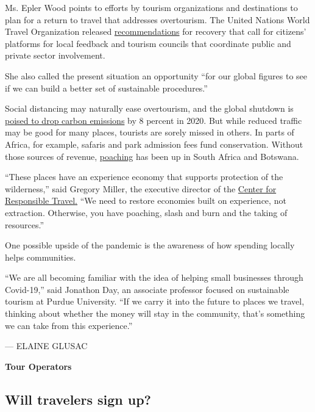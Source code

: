 Ms. Epler Wood points to efforts by tourism organizations and
destinations to plan for a return to travel that addresses overtourism.
The United Nations World Travel Organization released
\href{https://webunwto.s3.eu-west-1.amazonaws.com/s3fs-public/2020-04/COVID19_Recommendations_English_1.pdf}{recommendations}
for recovery that call for citizens' platforms for local feedback and
tourism councils that coordinate public and private sector involvement.

She also called the present situation an opportunity ``for our global
figures to see if we can build a better set of sustainable procedures.''

Social distancing may naturally ease overtourism, and the global
shutdown is
\href{https://www.nytimes.com/2020/04/30/climate/global-emissions-decline.html}{poised
to drop carbon emissions} by 8 percent in 2020. But while reduced
traffic may be good for many places, tourists are sorely missed in
others. In parts of Africa, for example, safaris and park admission fees
fund conservation. Without those sources of revenue,
\href{https://www.nytimes.com/2020/04/08/science/coronavirus-poaching-rhinos.html}{poaching}
has been up in South Africa and Botswana.

``These places have an experience economy that supports protection of
the wilderness,'' said Gregory Miller, the executive director of the
\href{https://www.responsibletravel.org/}{Center for Responsible
Travel}\href{https://www.responsibletravel.org/}{.} ``We need to restore
economies built on experience, not extraction. Otherwise, you have
poaching, slash and burn and the taking of resources.''

One possible upside of the pandemic is the awareness of how spending
locally helps communities.

``We are all becoming familiar with the idea of helping small businesses
through Covid-19,'' said Jonathon Day, an associate professor focused on
sustainable tourism at Purdue University. ``If we carry it into the
future to places we travel, thinking about whether the money will stay
in the community, that's something we can take from this experience.''

--- ELAINE GLUSAC

\textbf{Tour Operators}

\hypertarget{will-travelers-sign-up}{%
\subsection{Will travelers sign up?}\label{will-travelers-sign-up}}

